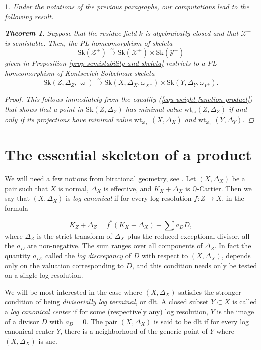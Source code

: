 \documentclass{amsart}%
\numberwithin{equation}{subsection}
\theoremstyle{plain2}
\newtheorem{thm}[equation]{Theorem}
\theoremstyle{definition2}
\theoremstyle{stepstyle}
\theoremstyle{point}
\theoremstyle{subpoint}
\newtheorem{subpoint}[equation]{}%
\newcommand{\spa}[1]{\begin{subpoint}#1\end{subpoint}}           %
\newcommand{\cX}{\ensuremath{\mathscr{X}}}
\newcommand{\cY}{\ensuremath{\mathscr{Y}}}
\newcommand{\cZ}{\ensuremath{\mathscr{Z}}}
\renewcommand{\cY}{\ensuremath{\mathscr{Y}}}
\newcommand{\weight}{\mathrm{wt}}
\newcommand{\Sk}{\mathrm{Sk}}
\begin{document}
\spa{Under the notations of the previous paragraphs, our computations lead to the following result.
\begin{thm}  \label{thm semistability and KS skeleta}
Suppose that the residue field $k$ is algebraically closed and that $\cX^+$ is semistable. Then, the PL homeomorphism of skeleta $$\Sk(\cZ^+) \xrightarrow{\sim} \Sk(\cX^+) \times \Sk(\cY^+)$$ given in Proposition \ref{prop semistability and skeleta} restricts to a PL homeomorphism of Kontsevich-Soibelman skeleta $$\Sk(Z,\Delta_Z, \varpi) \xrightarrow{\sim} \Sk(X,\Delta_X, \omega_{X^+}) \times \Sk(Y,\Delta_Y, \omega_{Y^+}).$$ 
\end{thm}
\begin{proof}
This follows immediately from the equality (\ref{equ weight function product}) that shows that a point in $\Sk(Z,\Delta_Z)$ has minimal value $\weight_{\varpi}(Z,\Delta_Z)$ if and only if its projections have minimal value $\weight_{\omega_{X^+}}(X,\Delta_X)$ and $\weight_{\omega_{Y^+}}(Y,\Delta_Y)$.
\end{proof}
}

\section{The essential skeleton of a product}
We will need a few notions from birational geometry, see \cite{KollarMori}. Let $(X,\Delta_X)$ be a pair such that $X$ is normal, $\Delta_X$ is effective, and $K_X+\Delta_X$ is $\mathbb{Q}$-Cartier. Then we say that $(X,\Delta_X)$ is \emph{log canonical} if for every log resolution $f \colon Z \to X$, in the formula

\[
K_Z+\Delta_Z = f^*(K_X+\Delta_X)+\sum a_D D,
\]
where $\Delta_Z$ is the strict transform of $\Delta_X$ plus the reduced exceptional divisor, all the $a_D$ are non-negative. The sum ranges over all components of $\Delta_Z$. In fact the quantity $a_D$, called the \emph{log discrepancy} of $D$ with respect to $(X,\Delta_X)$, depends only on the valuation corresponding to $D$, and this condition needs only be tested on a single log resolution.

We will be most interested in the case where $(X,\Delta_X)$ satisfies the stronger condition of being \emph{divisorially log terminal}, or dlt. A closed subset $Y \subset X$ is called a \emph{log canonical center} if for some (respectively any) log resolution, $Y$ is the image of a divisor $D$ with $a_D=0$. The pair $(X,\Delta_X)$ is said to be dlt if for every log canonical center $Y$, there is a neighborhood of the generic point of $Y$ where $(X,\Delta_X)$ is snc.
\end{document}
